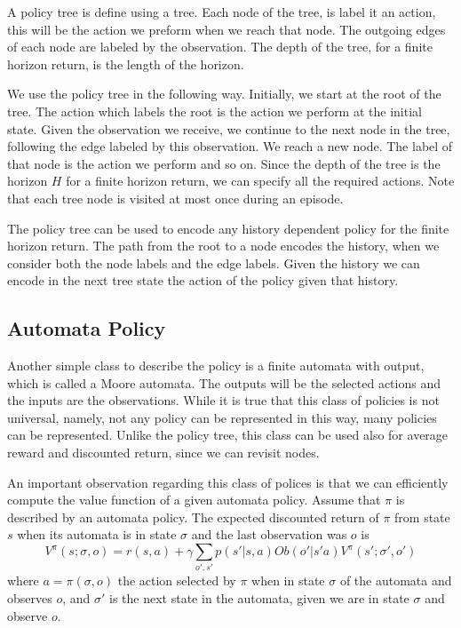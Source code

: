 A policy tree is define using a tree. Each node of the tree, is label it an action, this will be the action we preform when we reach that node. The outgoing edges of each node are labeled by the observation. The depth of the tree, for a finite horizon return, is the length of the horizon.

We use the policy tree in the following way. Initially, we start at the root of the tree. The action which labels the root is the action we perform at the initial state. Given the observation we receive, we continue to the next node in the tree, following the edge labeled by this observation. We reach a new node. The label of that node is the action we perform and so on. Since the depth of the tree is the horizon $H$ for a finite horizon return, we can specify all the required actions. Note that each tree node is visited at most once during an episode.

The policy tree can be used to encode any history dependent  policy for the finite horizon return. The path from the root to a node encodes the history, when we consider both the node labels and the edge labels. Given the history we can encode in the next tree state the action of the policy given that history. 

\subsection{Automata Policy}

Another simple class to describe the policy is a finite automata with output, which is called a Moore automata. The outputs will be the selected actions and the inputs are the observations. While it is true that this class of policies is not universal, namely, not any policy can be represented in this way, many policies can be represented. Unlike the policy tree, this class can be used also for average reward and discounted return, since we can revisit nodes.

An important observation regarding this class of polices is that we can efficiently compute the value function of a given automata policy. Assume that $\pi$ is described by an automata policy. The expected discounted return of $\pi$ from
state $s$ when its automata is in state $\sigma$ and the last observation was $o$ is
\[
V^\pi(s;\sigma,o)=r(s,a)+\gamma \sum_{o',s'}
p(s'|s,a)Ob(o'|s'a)V^\pi(s';\sigma',o')
\]
where $a=\pi(\sigma,o)$ the action selected by $\pi$ when in state $\sigma$ of the automata and observes $o$, and $\sigma'$ is the next state in the automata, given we are in state $\sigma$ and observe $o$.

